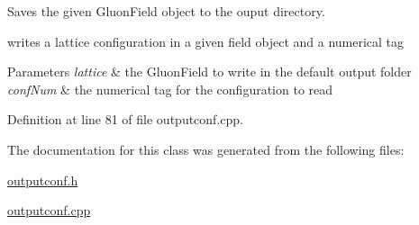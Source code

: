 Saves the given Gluon\+Field object to the ouput directory. 

writes a lattice configuration in a given field object and a numerical tag


\begin{DoxyParams}{Parameters}
{\em lattice} & the Gluon\+Field to write in the default output folder \\
\hline
{\em conf\+Num} & the numerical tag for the configuration to read \\
\hline
\end{DoxyParams}


Definition at line 81 of file outputconf.\+cpp.



The documentation for this class was generated from the following files\+:\begin{DoxyCompactItemize}
\item 
\hyperlink{outputconf_8h}{outputconf.\+h}\item 
\hyperlink{outputconf_8cpp}{outputconf.\+cpp}\end{DoxyCompactItemize}
